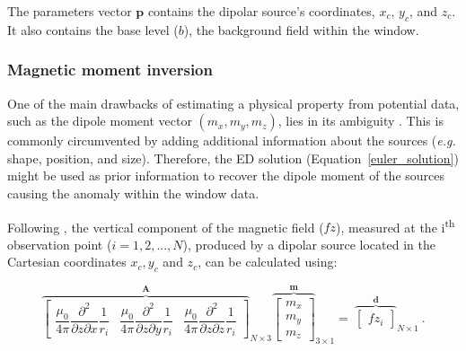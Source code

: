     The parameters vector $\mathbf{p}$ contains the dipolar source's coordinates, $x_c$, $y_c$, and $z_c$. It also contains the base level ($b$), the background field within the window.
    
\subsubsection{Magnetic moment inversion} 
    One of the main drawbacks of estimating a physical property from potential data, such as the dipole moment vector $(m_x, m_y, m_z)$, lies in its ambiguity \citep{Blakely1996}. This is commonly circumvented by adding additional information about the sources (\textit{e.g.} shape, position, and size). Therefore, the ED solution (Equation~\ref{euler_solution}) might be used as prior information to recover the dipole moment of the sources causing the anomaly within the window data.
    
     Following \citet{Oliveira2015Estimation}, the vertical component of the magnetic field ($fz$), measured at the i\textsuperscript{th} observation point ($i=1, 2, ..., N$), produced by a dipolar source located in the Cartesian coordinates $x_c, y_c$ and $z_c$, can be calculated using:

     \begin{equation}
    \label{eq_dipole_bz}
    {\overbrace{\begin{bmatrix}
    \dfrac{\mu_0}{4\pi} \dfrac{\partial^2}{\partial z \partial x} \dfrac{1}{r_i}
    & \dfrac{\mu_0}{4\pi} \dfrac{\partial^2}{\partial z \partial y} \dfrac{1}{r_i}
    & \dfrac{\mu_0}{4\pi} \dfrac{\partial^2}{\partial z \partial z} \dfrac{1}{r_i}
    \end{bmatrix}}^{\mathbf{A}}}_{N \times 3}
    {\overbrace{{\begin{bmatrix}
    m_x \\ m_y \\ m_z
    \end{bmatrix}}}^{\mathbf{m}}}_{3 \times 1}
    =
    ~{\overbrace{\begin{bmatrix}
    fz_i
    \end{bmatrix}}^{\mathbf{d}}}_{N \times 1}
    \ .
    \end{equation}

